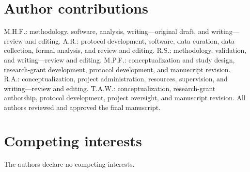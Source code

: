 \documentclass[pdflatex,sn-nature,iicol]{sn-jnl}
\begin{document}
\section*{Author contributions}
M.H.F.: methodology, software, analysis, writing---original draft, and writing---review and editing. A.R.: protocol development, software, data curation, data collection, formal analysis, and review and editing. R.S.: methodology, validation, and writing---review and editing. M.P.F.: conceptualization and study design, research-grant development, protocol development, and manuscript revision. R.A.: conceptualization, project administration, resources, supervision, and writing---review and editing. T.A.W.: conceptualization, research-grant authorship, protocol development, project oversight, and manuscript revision. All authors reviewed and approved the final manuscript.

\section*{Competing interests}
The authors declare no competing interests.
\end{document}
